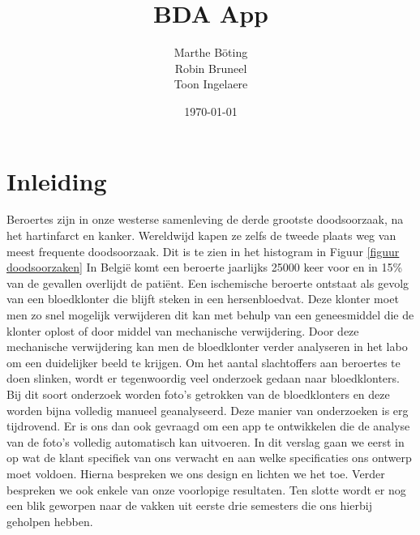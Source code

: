 \documentclass[a4paper,kulak]{kulakarticle}
\date{\today}
\title{BDA App}
\author{Marthe B\"{o}ting\\
	Robin Bruneel\\
	Toon Ingelaere}
\begin{document}
	
	\newpage
	
	\maketitle
	\newline
	\newline
	\newline
	\newline
	\newline
	\newline
	\section*{Inleiding}
		Beroertes zijn in onze westerse samenleving de derde grootste doodsoorzaak, na het hartinfarct en kanker. Wereldwijd kapen ze zelfs de tweede plaats weg van meest frequente doodsoorzaak. Dit is te zien in het histogram in Figuur \ref{figuur doodsoorzaken} In België komt een beroerte jaarlijks 25000 keer voor en in 15\% van de gevallen overlijdt de patiënt. Een ischemische beroerte ontstaat als gevolg van een bloedklonter die blijft steken in een hersenbloedvat.	
		Deze klonter moet men zo snel mogelijk verwijderen dit kan met behulp van een geneesmiddel die de klonter oplost of door middel van mechanische verwijdering. Door deze mechanische verwijdering kan men de bloedklonter verder analyseren in het labo om een duidelijker beeld te krijgen.
		\newline
		Om het aantal slachtoffers aan beroertes te doen slinken, wordt er tegenwoordig veel onderzoek gedaan naar bloedklonters. Bij dit soort onderzoek worden foto's getrokken van de bloedklonters en deze worden bijna volledig manueel geanalyseerd. Deze manier van onderzoeken is erg tijdrovend. Er is ons dan ook gevraagd om een app te ontwikkelen die de analyse van de foto’s volledig automatisch kan uitvoeren.
		\newline
		In dit verslag gaan we eerst in op wat de klant specifiek van ons verwacht en aan welke specificaties ons ontwerp moet voldoen. Hierna bespreken we ons design en lichten we het toe. Verder bespreken we ook enkele van onze voorlopige resultaten. Ten slotte wordt er nog een blik geworpen naar de vakken uit eerste drie semesters die ons hierbij geholpen hebben.
\end{document}

